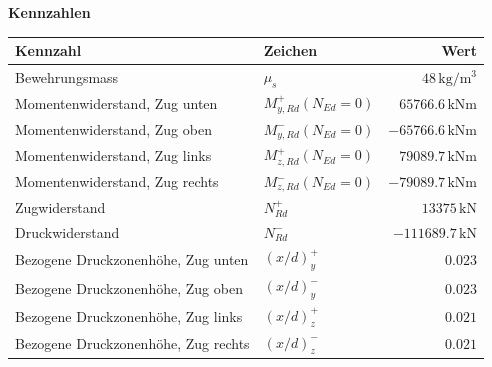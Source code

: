 \documentclass[11pt,a4paper]{article}
\begin{document}
\noindent\textbf{Kennzahlen}
\begin{longtable}{llr}
\hline
Kennzahl & Zeichen & Wert \\
\hline
\endhead
Bewehrungsmass & $\mu_s$ & $48\,\mathrm{kg}/\mathrm{m}^{3}$ \\
Momentenwiderstand, Zug unten & $M_{y,Rd}^{+}(N_{Ed} = 0)$ & $65766.6\,\mathrm{kNm}$ \\
Momentenwiderstand, Zug oben & $M_{y,Rd}^{-}(N_{Ed} = 0)$ & $-65766.6\,\mathrm{kNm}$ \\
Momentenwiderstand, Zug links & $M_{z,Rd}^{+}(N_{Ed} = 0)$ & $79089.7\,\mathrm{kNm}$ \\
Momentenwiderstand, Zug rechts & $M_{z,Rd}^{-}(N_{Ed} = 0)$ & $-79089.7\,\mathrm{kNm}$ \\
Zugwiderstand & $N_{Rd}^{+}$ & $13375\,\mathrm{kN}$ \\
Druckwiderstand & $N_{Rd}^{-}$ & $-111689.7\,\mathrm{kN}$ \\
Bezogene Druckzonenhöhe, Zug unten & $\left(x/d\right)_{y}^{+}$ & $0.023$ \\
Bezogene Druckzonenhöhe, Zug oben & $\left(x/d\right)_{y}^{-}$ & $0.023$ \\
Bezogene Druckzonenhöhe, Zug links & $\left(x/d\right)_{z}^{+}$ & $0.021$ \\
Bezogene Druckzonenhöhe, Zug rechts & $\left(x/d\right)_{z}^{-}$ & $0.021$ \\
\hline
\end{longtable}
\end{document}
